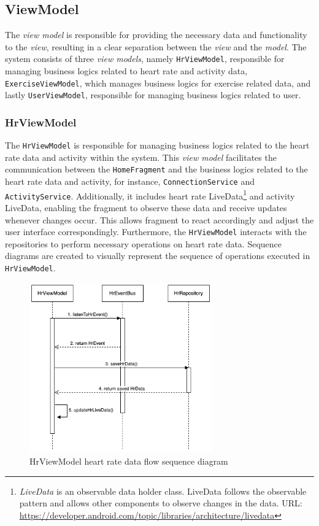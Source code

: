 \subsection{ViewModel}
\label{chap:viewmodel_design}
The \emph{view model} is responsible for providing the necessary data and functionality to the \emph{view}, resulting in a clear separation between the \emph{view} and the \emph{model}.
The system consists of three \emph{view models}, namely \texttt{HrViewModel}, responsible for managing business logics related to heart rate and activity data, \texttt{ExerciseViewModel}, which manages business logics for exercise related data, and lastly \texttt{UserViewModel}, responsible for managing business logics related to user.

\subsubsection{HrViewModel}
\label{chap:hrviewmodel_design}
The \texttt{HrViewModel} is responsible for managing business logics related to the heart rate data and activity within the system.
This \emph{view model} facilitates the communication between the \texttt{HomeFragment} and the business logics related to the heart rate data and activity, for instance, \texttt{ConnectionService} and \texttt{ActivityService}.
Additionally, it includes heart rate LiveData\footnote{\emph{LiveData} is an observable data holder class. LiveData follows the observable pattern and allows other components to observe changes in the data. URL: \url{https://developer.android.com/topic/libraries/architecture/livedata}} and activity LiveData, enabling the fragment to observe these data and receive updates whenever changes occur. This allows fragment to react accordingly and adjust the user interface correspondingly.
Furthermore, the \texttt{HrViewModel} interacts with the repositories to perform necessary operations on heart rate data.
Sequence diagrams are created to visually represent the sequence of operations executed in \texttt{HrViewModel}.

\begin{figure}[H]
    \centering
    \includegraphics[width=0.7\textwidth]{diagrams/hrviewmodel-hr.drawio.png}
    \caption{HrViewModel heart rate data flow sequence diagram}
    \label{fig:hrviewmodel_hrdata}
\end{figure}

